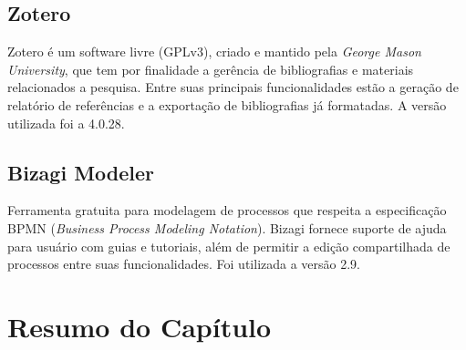\subsection{Zotero}
Zotero é um software livre (GPLv3), criado e mantido pela \textit{George Mason University}, que tem por finalidade a gerência de bibliografias e materiais relacionados a pesquisa. Entre suas principais funcionalidades estão a geração de relatório de referências e a exportação de bibliografias já formatadas. A versão utilizada foi a 4.0.28.

\subsection{Bizagi Modeler}
Ferramenta gratuita para modelagem de processos que respeita a especificação BPMN (\textit{Business Process Modeling Notation}). Bizagi fornece suporte de ajuda para usuário com guias e tutoriais, além de permitir a edição compartilhada de processos entre suas funcionalidades. Foi utilizada a versão 2.9.

\section{Resumo do Capítulo}

